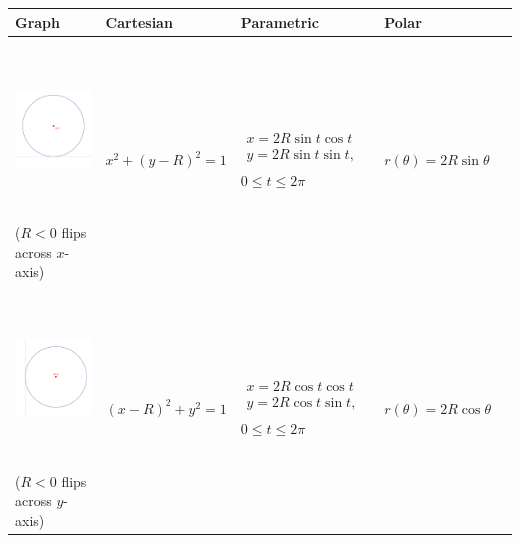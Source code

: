 \documentclass[12pt]{article}
\begin{document}
	\begin{center}
	\begin{tabular}{|C{2.75in}|C{1.625in}|C{1.625in}|C{1.625in}|N}
		\hline
		\textbf{Graph} & 
		\textbf{Cartesian} & 
		\textbf{Parametric} & 
		\textbf{Polar}& \\[5mm]
		
		\hline
		\includegraphics[trim={0 0 0 -4.5mm}, clip, height=1.875in]{2_Circles2} \newline ($R<0$ flips across $x$-axis) \vspace{3mm} &	
		$x^2+(y-R)^2=1$ & 
		$\begin{array}{c}
		x=2R\sin{t}\cos{t}\\
		y=2R\sin{t}\sin{t},\\[6mm]
		\end{array}$ $0\leq t\leq 2\pi$ \vspace{-10mm} & 
		$r(\theta)=2R\sin{\theta}$ & \\
		
		\hline
		\includegraphics[trim={0 0 0 -4.5mm}, clip, height=1.875in]{2_Circles3} \newline ($R<0$ flips across $y$-axis) \vspace{3mm} &
		$(x-R)^2+y^2=1$ & 
		$\begin{array}{c}
		x=2R\cos{t}\cos{t}\\
		y=2R\cos{t}\sin{t},\\[6mm]
		\end{array}$ $0\leq t\leq 2\pi$ \vspace{-10mm} & 
		$r(\theta)=2R\cos{\theta}$ & \\
		

\end{tabular}
\end{center}
\end{document}
